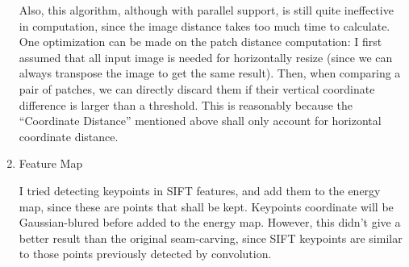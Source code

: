 \begin{enumerate}
    Also, this algorithm, although with parallel support, is still quite ineffective in computation,
    since the image distance takes too much time to calculate. One optimization can be made on
    the patch distance computation: I first assumed that all input image is needed for
    horizontally resize (since we can always transpose the image to get the same result).
    Then, when comparing a pair of patches,
    we can directly discard them if their vertical coordinate difference is larger than a threshold.
    This is reasonably because the ``Coordinate Distance'' mentioned above shall only
    account for horizontal coordinate distance.

  \item Feature Map

    I tried detecting keypoints in SIFT features, and add them to the energy map, since these are
    points that shall be kept. Keypoints coordinate will be Gaussian-blured before
    added to the energy map. However, this didn't give a better result than the original seam-carving,
    since SIFT keypoints are similar to those points previously detected by convolution.

\end{enumerate}

